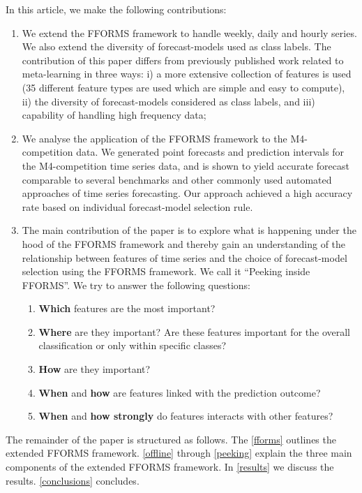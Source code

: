 \documentclass[11pt,a4paper,]{article}
\providecommand{\tightlist}{%
  \setlength{\itemsep}{0pt}\setlength{\parskip}{0pt}}
\begin{document}
In this article, we make the following contributions:

\begin{enumerate}
\def\labelenumi{\arabic{enumi}.}
\tightlist
\item
  We extend the FFORMS framework to handle weekly, daily and hourly series. We also extend the diversity of forecast-models used as class labels. The contribution of this paper differs from previously published work related to meta-learning \autocites{prudencio2004meta}{lemke2010meta}{kuck2016meta} in three ways: i) a more extensive collection of features is used (35 different feature types are used which are simple and easy to compute), ii) the diversity of forecast-models considered as class labels, and iii) capability of handling high frequency data;
\item
  We analyse the application of the FFORMS framework to the M4-competition data. We generated point forecasts and prediction intervals for the M4-competition time series data, and is shown to yield accurate forecast comparable to several benchmarks and other commonly used automated approaches of time series forecasting. Our approach achieved a high accuracy rate based on individual forecast-model selection rule.
\item
  The main contribution of the paper is to explore what is happening under the hood of the FFORMS framework and thereby gain an understanding of the relationship between features of time series and the choice of forecast-model selection using the FFORMS framework. We call it ``Peeking inside FFORMS''. We try to answer the following questions:

  \begin{enumerate}
  \def\labelenumii{\roman{enumii})}
  \tightlist
  \item
    \textbf{Which} features are the most important?
  \item
    \textbf{Where} are they important? Are these features important for the overall classification or only within specific classes?
  \item
    \textbf{How} are they important?
  \item
    \textbf{When} and \textbf{how} are features linked with the prediction outcome?
  \item
    \textbf{When} and \textbf{how strongly} do features interacts with other features?
  \end{enumerate}
\end{enumerate}

The remainder of the paper is structured as follows. The \autoref{fforms} outlines the extended FFORMS framework. \autoref{offline} through \autoref{peeking} explain the three main components of the extended FFORMS framework. In \autoref{results} we discuss the results. \autoref{conclusions} concludes.
\end{document}
